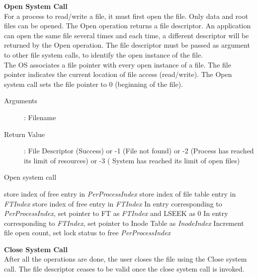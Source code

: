 \documentclass[10pt]{article}
\begin{document}
\textbf{Open System Call}
\vspace{3mm}\\
For a process to read/write a file, it must first open the file. Only data and root files can be opened. The Open operation returns a file descriptor. An application can open the same file several times and each time, a different descriptor will be returned by the Open operation. The file descriptor must be passed as argument to other file system calls, to identify the open instance of the file.
\vspace{2mm}\\
The OS associates a file pointer with every open instance of a file. The file pointer indicates the current location of file access (read/write). The Open system call sets the file pointer to 0 (beginning of the file).
\vspace{2mm}
\begin{description}
	\item[Arguments]: Filename
	\item[Return Value]: File Descriptor (Success) or -1 (File not found) or -2 (Process has reached its limit of resources) or -3 ( 	System has reached its limit of open files)
\end{description} 
\begin{algorithm}
\caption{Open system call}
\begin{algorithmic}
\ENDIF
{}
\ENDIF
{}
\ELSE
    \STATE store index of free entry in \textit{PerProcessIndex}
\ENDIF    
{}
    \STATE store index of file table entry in \textit{FTIndex}
\ELSE
    \ELSE 
        \STATE store index of free entry in \textit{FTIndex}
    \ENDIF
\ENDIF
\STATE In entry corresponding to \textit{PerProcessIndex}, set pointer to FT as \textit{FTIndex} and LSEEK as 0
\STATE In entry corresponding to \textit{FTIndex}, set pointer to Inode Table as \textit{InodeIndex} 
\STATE Increment file open count, set lock status to free
\RETURN \textit{PerProcessIndex} 
\end{algorithmic}
\end{algorithm}
\vspace{5mm}
\textbf{Close System Call}
\vspace{2mm}\\
 After all the operations are done, the user closes the file using the Close system call. The file descriptor ceases to be valid once the close system call is invoked. 
\end{document}
